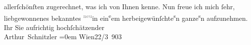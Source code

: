 \begin{ledgroupsized}[t]{13cm}
                    allerſchönſten zugerechnet, was ich von Ihnen {\pb}kenne.
                    Nun freue ich mich ſehr, liebgewonnenes bekanntes \substVorne{}\textsuperscript{\textcolor{gray}{neu}}\substDazwischen{}in\substHinten{} ein\substVorne{}\textsuperscript{e}\substDazwischen{}em\substHinten{} herbeigewünſchte\substVorne{}\textsuperscript{s}\substDazwischen{}n\substHinten{} ganze\substVorne{}\textsuperscript{s}\substDazwischen{}n\substHinten{} aufzunehmen.\pend
           \pstart
           Ihr Sie aufrichtig hochſchätzender{\\[\baselineskip]}\spacefill\mbox{Arthur Schnitzler}\pend
           \leftskip=0em{}\pstart
           Wien22/3 903\pend
           
         
         \endnumbering{}\end{ledgroupsized}  \newcommand{\dateiname}{L01278}\newcommand{\titel}{Arthur Schnitzler an Richard Dehmel, 22. 3. 1903}\newcommand{\editorInnen}{ Martin Anton Müller und Gerd-Hermann Susen}
      
